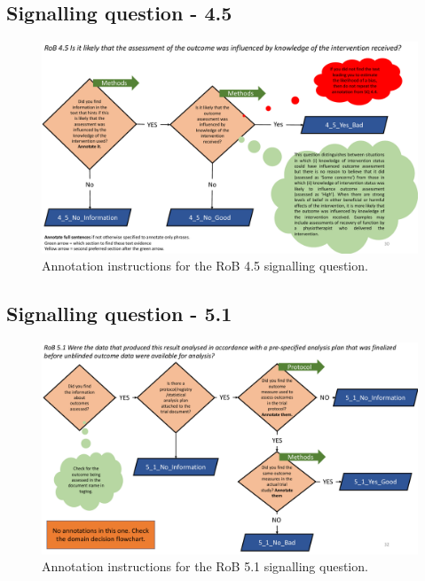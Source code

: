 \documentclass[sn-mathphys,Numbered]{sn-jnl}%
\begin{document}
\subsection*{Signalling question - 4.5 }
%
\begin{figure}[htbp]
    \centering
    \includegraphics[width=\textwidth]{figures/4_5.pdf}
    \caption{Annotation instructions for the RoB 4.5 signalling question.}
    \label{fig:4_5}
\end{figure}
%
%
%
\subsection*{Signalling question - 5.1 }
%
\begin{figure}[htbp]
    \centering
    \includegraphics[width=\textwidth]{figures/5_1.pdf}
    \caption{Annotation instructions for the RoB 5.1 signalling question.}
    \label{fig:5_1}
\end{figure}
%
%
%
\end{document}
